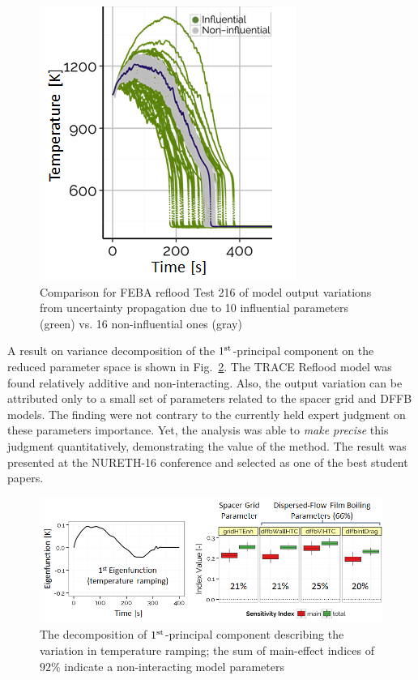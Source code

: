 \documentclass[11pt,titlepage]{article}
\begin{document}
\begin{figure}[h!]
	\centering
	\includegraphics[scale=0.62]{figures/influentialRuns.png}
	\caption{Comparison for FEBA reflood Test 216 of model output variations from uncertainty propagation due to 10 influential parameters (green) vs. 16 non-influential ones (gray)}
	\label{fig:influential}
\end{figure}

A result on variance decomposition of the $1^\textnormal{st}$-principal component on the reduced parameter space is shown in Fig.~\ref{fig:1stpc}.
The TRACE Reflood model was found relatively additive and non-interacting.
Also, the output variation can be attributed only to a small set of parameters related to the spacer grid and DFFB models. 
The finding were not contrary to the currently held expert judgment on these parameters importance.
Yet, the analysis was able to \emph{make precise} this judgment quantitatively, demonstrating the value of the method.
The result was presented at the NURETH-16 conference \cite{Wicaksono2015a} and selected as one of the best student papers.

\begin{figure}[h!]
	\centering
	\includegraphics[scale=0.65]{figures/1stPrincipalComponent.png}
	\caption{The decomposition of $1^\textnormal{st}$-principal component describing the variation in temperature ramping; the sum of main-effect indices of $92\%$ indicate a non-interacting model parameters}
	\label{fig:1stpc}
\end{figure}
\end{document}
